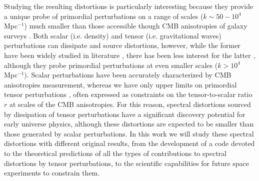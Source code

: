 Studying the resulting distortions is particularly interesting because they provide a unique probe of primordial perturbations on a range of scales ($k\sim50-10^{4}$ Mpc$^{-1}$) much smaller than those accessible though CMB anisotropies of galaxy surveys \cite{chlubafuturestepscosmologyusing}. Both scalar (i.e. density) and tensor (i.e. gravitational waves) perturbations can dissipate and source distortions, however, while the former have been widely studied in literature \cite{Lucca_2020,Chluba_2x2}, there has been less interest for the latter \cite{Chluba_tens_diss}, although they probe primordial perturbations at even smaller scales ($k>10^{4}$ Mpc$^{-1}$). Scalar perturbations have been accurately characterized by CMB anisotropies measurement, whereas we have only upper limits on primordial tensor perturbations \cite{Ade_2021,planck2018results}, often expressed as constraints on the tensor-to-scalar ratio $r$ at scales of the CMB anisotropies. For this reason, spectral distortions sourced by dissipation of tensor perturbations have a significant discovery potential for early universe physics, although these distortions are expected to be smaller than those generated by scalar perturbations. In this work we will study these spectral distortions with different original results, from the development of a code devoted to the theoretical predictions of all the types of contributions to spectral distortions by tensor perturbations, to the scientific capabilities for future space experiments to constrain them.

